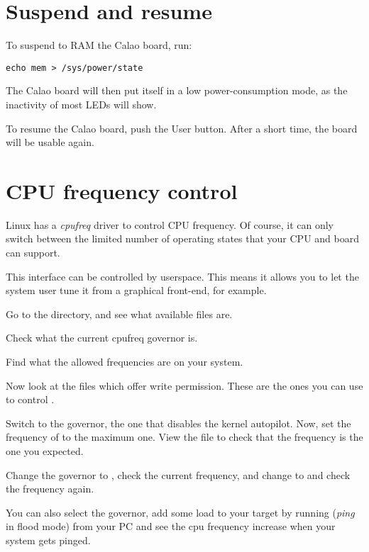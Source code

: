 \section{Suspend and resume}

To suspend to RAM the Calao board, run:

\begin{verbatim}
echo mem > /sys/power/state
\end{verbatim}

The Calao board will then put itself in a low power-consumption mode,
as the inactivity of most LEDs will show.

To resume the Calao board, push the User button. After a short time,
the board will be usable again.

\section{CPU frequency control}

Linux has a {\em cpufreq} driver to control CPU frequency. Of course, it can
only switch between the limited number of operating states that your
CPU and board can support.

This interface can be controlled by userspace. This means it allows
you to let the system user tune it from a graphical front-end, for
example.

Go to the  directory, and
see what available files are.

Check what the current cpufreq governor is.

Find what the allowed frequencies are on your system.

Now look at the files which offer write permission. These are the ones
you can use to control .

Switch to the  governor, the one that disables the
kernel autopilot.  Now, set the frequency of  to the maximum
one. View the  file to check that the
frequency is the one you expected.

Change the governor to , check the current frequency,
and change to  and check the frequency again.

You can also select the  governor, add some load to your
target by running  ({\em ping} in flood mode) from
your PC and see the cpu frequency increase when your system gets
pinged.

